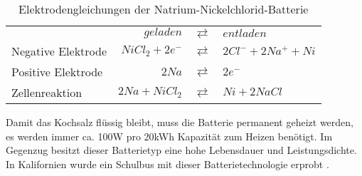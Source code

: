 \begin{table}\centering
  \begin{tabularx}{\linewidth}{XrcX}
  	                   &       $geladen$ & $\rightleftarrows$ & $entladen$           \\
  	Negative Elektrode & $NiCl_2 + 2e^-$ & $\rightleftarrows$ & $2Cl^- + 2Na^+ + Ni$ \\
  	Positive Elektrode &           $2Na$ & $\rightleftarrows$ & $2e^-$               \\ \midrule
  	Zellenreaktion     &  $2Na + NiCl_2$ & $\rightleftarrows$ & $Ni + 2NaCl$
  \end{tabularx}
  \caption{Elektrodengleichungen der Natrium-Nickelchlorid-Batterie}
  \label{ZEBRA}
\end{table}

Damit das Kochsalz flüssig bleibt, muss die Batterie permanent geheizt werden, es werden immer ca. 100W pro 20kWh Kapazität zum Heizen benötigt. Im Gegenzug besitzt dieser Batterietyp eine hohe Lebensdauer und Leistungsdichte. In Kalifornien wurde ein Schulbus mit dieser Batterietechnologie erprobt \cite{Electric-Transportation-Department:2004}.

